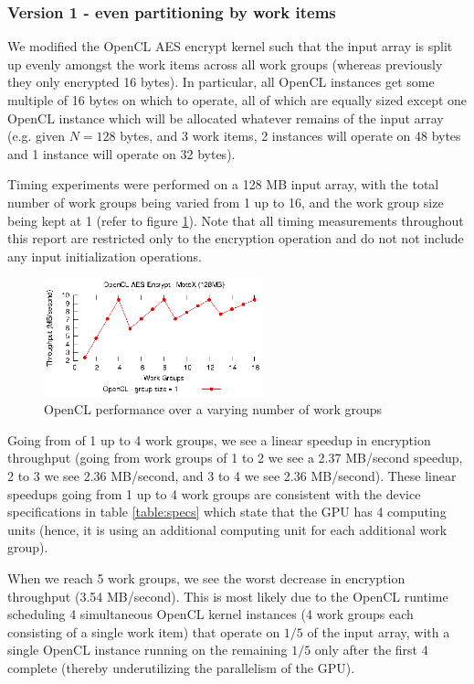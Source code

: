 \documentclass[conference,10pt]{IEEEtran}
\begin{document}
\subsubsection{Version 1 - even partitioning by work items}
\label{subsec:impl_partition}

We modified the OpenCL AES encrypt kernel such that the input array is split up evenly amongst the work 
items across all work groups (whereas previously they only encrypted 16 bytes). In particular, all OpenCL 
instances get some multiple of 16 bytes on which to operate, all of which are equally sized except one 
OpenCL instance which will be allocated whatever remains of the input array (e.g.  given $N = 128$ bytes, 
and 3 work items, 2 instances will operate on 48 bytes and 1 instance will operate on 32 bytes). 

Timing experiments were performed on a 128 MB input array, with the total number of work groups being 
varied from 1 up to 16, and the work group size being kept at 1 (refer to figure 
\ref{fig:num_work_groups}).  Note that all timing measurements throughout this report are restricted only 
to the encryption operation and do not not include any input initialization operations.

\begin{figure}[!t]
\centering
\includegraphics[width=2.5in]{../final/motox/4.2/sample_opencl_aes_global_worksize.128MB.16_max_global_worksize.again.report.eps}
\caption{OpenCL performance over a varying number of work groups}
\label{fig:num_work_groups}
\end{figure}

Going from of 1 up to 4 work groups, we see a linear speedup in encryption throughput (going from work 
groups of 1 to 2 we see a 2.37 MB/second speedup, 2 to 3 we see 2.36 MB/second, and 3 to 4 we see 2.36 
MB/second). These linear speedups going from 1 up to 4 work groups are consistent with the device 
specifications in table \ref{table:specs} which state that the GPU has 4 computing units (hence, it is 
using an additional computing unit for each additional work group).

When we reach 5 work groups, we see the worst decrease in encryption throughput (3.54 MB/second).  This is 
most likely due to the OpenCL runtime scheduling 4 simultaneous OpenCL kernel instances (4 work groups each 
consisting of a single work item) that operate on $1/5$ of the input array, with a single OpenCL instance 
running on the remaining $1/5$ only after the first 4 complete (thereby underutilizing the parallelism of 
the GPU).
\end{document}
